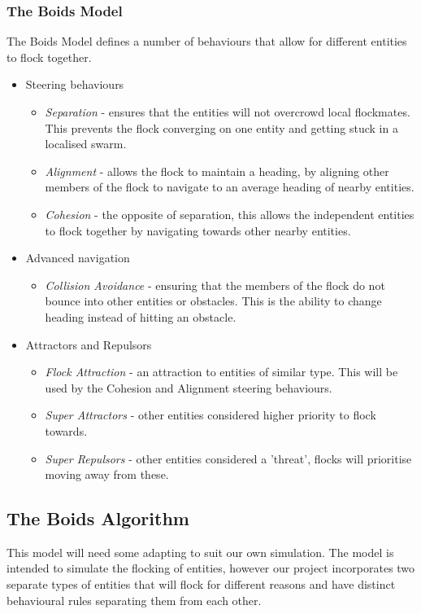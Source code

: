 \subsubsection{The Boids Model}
The Boids Model defines a number of behaviours that allow for different entities to flock together.
\begin{itemize}
	\item Steering behaviours
	\begin{itemize}
		\item \emph{Separation} - ensures that the entities will not overcrowd local flockmates. This prevents the flock converging on one entity and getting stuck in a localised swarm.
		\item \emph{Alignment} - allows the flock to maintain a heading, by aligning other members of the flock to navigate to an average heading of nearby entities.
		\item \emph{Cohesion} - the opposite of separation, this allows the independent entities to flock together by navigating towards other nearby entities.
	\end{itemize}
	\item Advanced navigation
	\begin{itemize}
		\item \emph{Collision Avoidance} - ensuring that the members of the flock do not bounce into other entities or obstacles. This is the ability to change heading instead of hitting an obstacle.
	\end{itemize}
	\item Attractors and Repulsors
	\begin{itemize}
		\item \emph{Flock Attraction} - an attraction to entities of similar type. This will be used by the Cohesion and Alignment steering behaviours.
		\item \emph{Super Attractors} - other entities considered higher priority to flock towards.
		\item \emph{Super Repulsors} - other entities considered a 'threat', flocks will prioritise moving away from these.
	\end{itemize}
\end{itemize}

\subsection{The Boids Algorithm}
This model will need some adapting to suit our own simulation. The model is intended to simulate the flocking of entities, however our project incorporates two separate types of entities that will flock for different reasons and have distinct behavioural rules separating them from each other.

